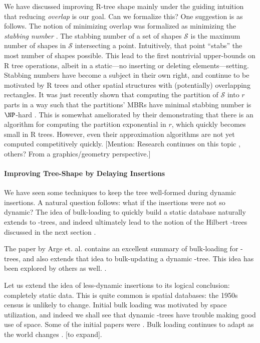 We have discussed improving R-tree shape mainly under the guiding intuition that reducing \emph{overlap} is our goal.
Can we formalize this?
One suggestion is as follows.
The notion of minimizing overlap was formalized as minimizing the \emph{stabbing number} \cite{berggudmundssonhammarovermars00}.
The stabbing number of a set of shapes $\mathcal S$ is the maximum number of shapes in $\mathcal S$ intersecting a point.
Intuitively, that point ``stabs'' the most number of shapes possible.
This lead to the first nontrivial upper-bounds on R tree operations, albeit in a static---no inserting or deleting elements---setting.
Stabbing numbers have become a subject in their own right, and continue to be motivated by R trees and other spatial structures with (potentially) overlapping rectangles.
It was just recently shown that computing the partition of $\mathcal S$ into $r$ parts in a way such that the partitions' MBRs have minimal stabbing number is $\NP$-hard \cite{bergkhosraviverdonschotweele11}.
This is somewhat ameliorated by their demonstrating that there is an algorithm for computing the partition exponential in $r$, which quickly becomes small in R trees.
However, even their approximation algorithms are not yet computed competitively quickly.
[Mention: Research continues on this topic \cite{durochermehrabi12}, others? From a graphics/geometry perspective.]

\paragraph{Improving Tree-Shape by Delaying Insertions}
We have seen some techniques to keep the tree well-formed during dynamic insertions.
A natural question follows: what if the insertions were not so dynamic?
The idea of bulk-loading to quickly build a static database naturally extends to \rbase-trees, and indeed ultimately lead to the notion of the Hilbert \rbase-trees discussed in the next section \cite{kamelfaloutosos94}.

The paper by Arge et. al. \cite{argehinrichsvahrenholdvitter99} contains an excellent summary of bulk-loading for \rbase-trees, and also extends that idea to bulk-updating a dynamic \rbase-tree.
This idea has been explored by others as well.
\cite{biveinissaltenisjensen07}.

Let us extend the idea of less-dynamic insertions to its logical conclusion: completely static data.
This is quite common is spatial databases: the 1950s census is unlikely to change.
Initial bulk loading was motivated by space utilization, and indeed we shall see that dynamic \rbase-trees have trouble making good use of space.
Some of the initial papers were \cite{...}.
Bulk loading continues to adapt as the world changes \cite{tanluomaoni12}. 
[to expand].

